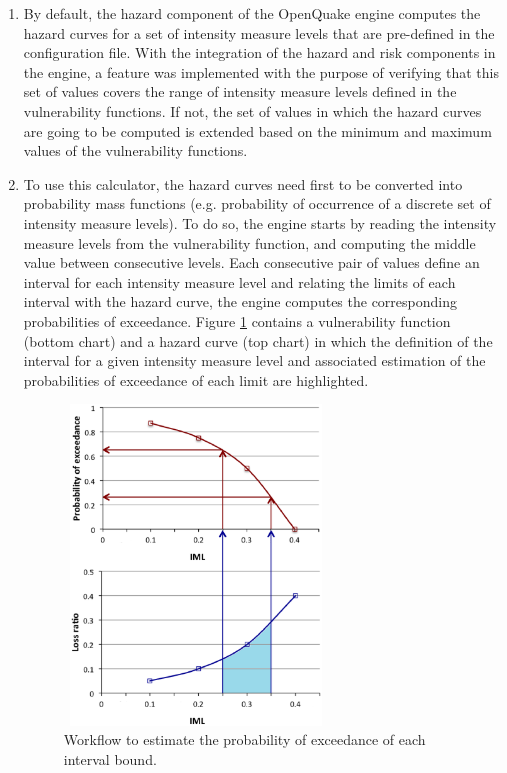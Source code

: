 \begin{enumerate}
\item By default, the hazard component of the OpenQuake engine computes the hazard curves for a set of intensity measure levels that are pre-defined in the configuration file. With the integration of the hazard and risk components in the engine, a feature was implemented with the purpose of verifying that this set of values  covers the range of intensity measure levels defined in the vulnerability functions. If not, the set of values in which the hazard curves are going to be computed is extended based on the minimum and maximum values of the vulnerability functions.

\item To use this calculator, the hazard curves need first to be converted into probability mass functions (e.g. probability of occurrence of a discrete set of intensity measure levels). To do so, the engine starts by reading the intensity measure levels from the vulnerability function, and computing the middle value between consecutive levels. Each consecutive pair of values define an interval for each intensity measure level and relating the limits of each interval with the hazard curve, the engine computes the corresponding probabilities of exceedance. Figure \ref{fig:ProbOccurrence} contains a vulnerability function (bottom chart) and a hazard curve (top chart) in which the definition of the interval for a given intensity measure level and associated estimation of the probabilities of exceedance of each limit are highlighted. 

\begin{figure}[ht]
\centering
\includegraphics[width=7cm,height=8.5cm]{./Figures/Part_Risk/ProbOccurrence.eps}
\caption{Workflow to estimate the probability of exceedance of each interval bound.}
\label{fig:ProbOccurrence}
\end{figure}


\end{enumerate}
